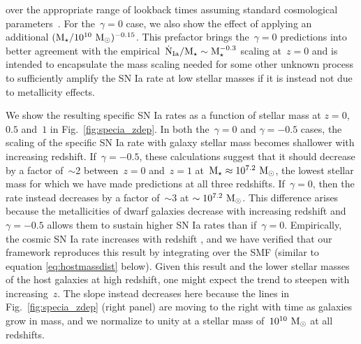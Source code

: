 \documentclass[foo.tex]{subfiles}
\begin{document}
over the appropriate range of lookback times assuming standard cosmological
parameters~\citep{Planck2014}.
For the~$\gamma = 0$ case, we also show the effect of applying an additional
$(\text{M}_\star / 10^{10}~\text{M}_\odot)^{-0.15}$.
This prefactor brings the~$\gamma = 0$ predictions into better agreement with
the empirical~$\dot{\text{N}}_\text{Ia} / \text{M}_\star \sim \text{M}_\star^{-0.3}$ scaling
at~$z = 0$ and is intended to encapsulate the mass scaling needed for some
other unknown process to sufficiently amplify the SN Ia rate at low stellar
masses if it is instead not due to metallicity effects.
\par
We show the resulting specific SN Ia rates as a function of stellar mass at
$z = 0$,~$0.5$ and~$1$ in Fig.~\ref{fig:specia_zdep}.
In both the~$\gamma = 0$ and $\gamma = -0.5$ cases, the scaling of the specific
SN Ia rate with galaxy stellar mass becomes shallower with increasing redshift.
If~$\gamma = -0.5$, these calculations suggest that it should decrease by a
factor of~$\sim$2 between~$z = 0$ and~$z = 1$ at~$\text{M}_\star \approx
10^{7.2}~\text{M}_\odot$, the lowest stellar mass for which we have made predictions at
all three redshifts.
If~$\gamma = 0$, then the rate instead decreases by a factor of~$\sim$3 at
$\sim 10^{7.2}~\text{M}_\odot$.
This difference arises because the metallicities of dwarf galaxies decrease
with increasing redshift and~$\gamma = -0.5$ allows them to sustain higher
SN Ia rates than if~$\gamma = 0$.
Empirically, the cosmic SN Ia rate increases with redshift
\citep[e.g.][]{Graur2014}, and we have verified that our framework reproduces
this result by integrating over the SMF (similar to equation
\ref{eq:hostmassdist} below).
Given this result and the lower stellar masses of the host galaxies at high
redshift, one might expect the trend to steepen with increasing~$z$.
The slope instead decreases here because the lines in Fig.~\ref{fig:specia_zdep}
(right panel) are moving to the right with time as galaxies grow in mass, and
we normalize to unity at a stellar mass of~$10^{10}~\text{M}_\odot$ at all redshifts.
\end{document}
